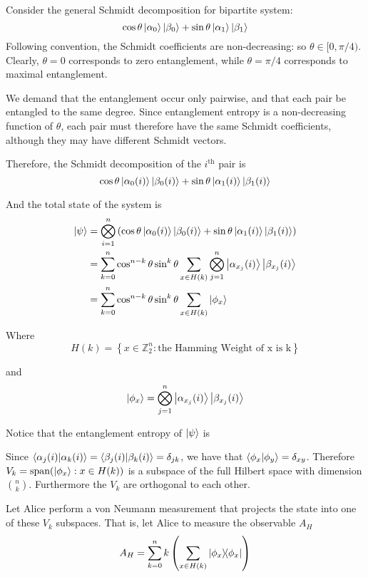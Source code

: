 \newcommand{\ZZ}{\mathbb{Z}} %
\newcommand{\vspan}{\text{span}} %
%
%
Consider the general Schmidt decomposition for bipartite system:
$$
\cos\theta \ket{\alpha_0} \ket{\beta_0} + 
\sin\theta \ket{\alpha_1} \ket{\beta_1}
$$
Following convention, the Schmidt coefficients are non-decreasing: so $\theta \in [0, \pi/4)$. Clearly, $\theta = 0$ corresponds to zero entanglement, while $\theta = \pi/4$ corresponds to maximal entanglement.


We demand that the entanglement occur only pairwise, and that each pair be entangled to the same degree. Since entanglement entropy is a non-decreasing function of $\theta$, each pair must therefore have the same Schmidt coefficients, although they may have different Schmidt vectors. 

Therefore, the Schmidt decomposition of the $i^{\text{th}}$ pair is  
$$
\cos\theta \ket{\alpha_0(i)} \ket{\beta_0(i)} + 
\sin\theta \ket{\alpha_1(i)} \ket{\beta_1(i)}
$$

And the total state of the system is
\begin{align}
	\ket{\psi} &= \bigotimes_{i=1}^n \left( 
	\cos\theta \ket{\alpha_0(i)} \ket{\beta_0(i)} + 
	\sin\theta \ket{\alpha_1(i)} \ket{\beta_1(i)} \right) \\
	&= \sum_{k=0}^n \cos^{n-k}\theta \sin^k\theta
	\sum_{x \in H(k)} \bigotimes_{j=1}^n 
	\ket{\alpha_{x_j}(i)} \ket{\beta_{x_j}(i)} \\
	&=  \sum_{k=0}^n \cos^{n-k}\theta \sin^k\theta
	\sum_{x \in H(k)} \ket{\phi_x}
\end{align}

Where 
$$
H(k) = \left\{ 
	x \in \ZZ_2^n : \text{the Hamming Weight of x is k} \right\}
$$

and
$$
\ket{\phi_x} = \bigotimes_{j=1}^n 
\ket{\alpha_{x_j}(i)} \ket{\beta_{x_j}(i)}
$$

Notice that the entanglement entropy of $\ket{\psi}$ is

Since $ \braket{\alpha_j(i)}{\alpha_k(i)} = \braket{\beta_j(i)}{\beta_k(i)} = \delta_{jk} $, we have that $\braket{\phi_x}{\phi_y} = \delta_{xy}$.
Therefore $V_k = \vspan(\ket{\phi_x} : x \in H(k))$ is a subspace of the full Hilbert space with dimension $\binom{n}{k}$.
Furthermore the $V_k$ are orthogonal to each other.

Let Alice perform a von Neumann measurement that projects the state into one of these $V_k$ subspaces. That is, let Alice to measure the observable $A_H$
$$
A_H = \sum_{k=0}^n k \left( \sum_{x \in H(k)}  \dyad{\phi_x}{\phi_x} \right) 
$$

